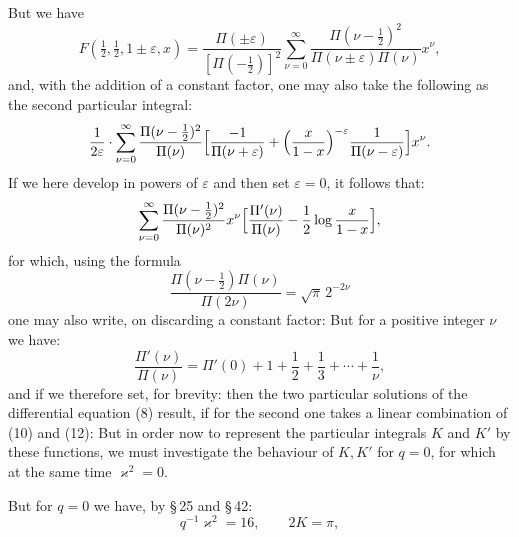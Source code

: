 
But we have
\[
F(\tfrac12,\tfrac12,1\pm\varepsilon,x) = \frac{\Pi(\pm\varepsilon)}{[\Pi(-\tfrac12)]^2} \sum_{\nu=0}^{\infty} \frac{\Pi(\nu-\tfrac12)^2}{\Pi(\nu\pm\varepsilon)\Pi(\nu)} x^\nu,
\]
and, with the addition of a constant factor, one may also take
the following as the second particular integral:
\[
\frac{1}{2\varepsilon}\cdot\sum_{\nu=0}^{\infty} \frac{\Pi(\nu-\tfrac12)^2}{\Pi(\nu)}\Bigl[\frac{-1}{\Pi(\nu+\varepsilon)} + \Bigl(\frac{x}{1-x}\Bigr)^{-\varepsilon}\frac{1}{\Pi(\nu-\varepsilon)}\Bigr]x^\nu.
\]
If we here develop in powers of $\varepsilon$ and then set
$\varepsilon=0$, it follows that:
\[
\sum_{\nu=0}^{\infty} \frac{\Pi(\nu-\tfrac12)^2}{\Pi(\nu)^2} x^\nu \Bigl[\frac{\Pi'(\nu)}{\Pi(\nu)} - \frac12 \log\frac{x}{1-x}\Bigr],
\]
for which, using the  formula
\[
\frac{\Pi(\nu-\tfrac12)\Pi(\nu)}{\Pi(2\nu)} = \sqrt{\pi}\,2^{-2\nu}
\]
one may also write, on discarding a constant factor:
But for a positive integer $\nu$ we have:
\[
\frac{\Pi'(\nu)}{\Pi(\nu)} = \Pi'(0) + 1 + \frac12 + \frac13 + \cdots + \frac1\nu,
\]
and if we therefore set, for brevity:
then the two particular solutions of the differential equation
 (8) result, if for the second one takes a linear combination
of (10) and (12):
But in order now to represent the particular integrals $K$ and $K'$ by
these functions, we must investigate the behaviour of $K,K'$
for $q=0$, for which at the same time $\varkappa^2=0$.

But for $q=0$ we have, by \S\,25 and \S\,42:
\[
q^{-1}\varkappa^2 = 16, \qquad 2K = \pi,
\]
